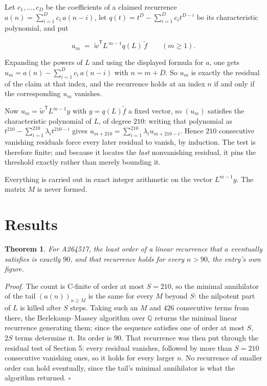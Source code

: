 \documentclass[11pt]{article}
\newtheorem{theorem}{Theorem}
\theoremstyle{definition}
\begin{document}
Let $c_1,\dots,c_D$ be the coefficients of a claimed recurrence $a(n) = \sum_{i=1}^{D} c_i\,a(n-i)$, let $q(t) = t^{D} - \sum_{i=1}^{D} c_i t^{D-i}$ be its characteristic polynomial, and put

\[u_m \;=\; \tilde w^{\mathsf T} L^{\,m-1} q(L)\,\tilde f \qquad (m \ge 1).\]

Expanding the powers of $L$ and using the displayed formula for $a$, one gets $u_m = a(n) - \sum_{i=1}^{D} c_i\,a(n-i)$ with $n = m + D$. So $u_m$ is exactly the residual of the claim at that index, and the recurrence holds at an index $n$ if and only if the corresponding $u_m$ vanishes.

Now $u_m = \tilde w^{\mathsf T} L^{m-1} y$ with $y = q(L)\tilde f$ a fixed vector, so $(u_m)$ satisfies the characteristic polynomial of $L$, of degree $210$: writing that polynomial as $t^{210} - \sum_{i=1}^{210} \lambda_i t^{210-i}$ gives $u_{m+210} = \sum_{i=1}^{210} \lambda_i u_{m+210-i}$. Hence $210$ consecutive vanishing residuals force every later residual to vanish, by induction. The test is therefore finite; and because it locates the {\itshape last} nonvanishing residual, it pins the threshold exactly rather than merely bounding it.

Everything is carried out in exact integer arithmetic on the vector $L^{m-1}y$. The matrix $M$ is never formed.

\section{Results}

\begin{theorem} For A264517, the least order of a linear recurrence that $a$ eventually satisfies is exactly $90$, and that recurrence holds for every $n > 90$, the entry's own figure.\end{theorem}

{\itshape Proof.} The count is C-finite of order at most $S = 210$, so the minimal annihilator of the tail $(a(n))_{n \ge M}$ is the same for every $M$ beyond $S$: the nilpotent part of $L$ is killed after $S$ steps. Taking such an $M$ and $426$ consecutive terms from there, the Berlekamp--Massey algorithm over $\mathbb{Q}$ returns the minimal linear recurrence generating them; since the sequence satisfies one of order at most $S$, $2S$ terms determine it. Its order is $90$. That recurrence was then put through the residual test of Section 5: every residual vanishes, followed by more than $S = 210$ consecutive vanishing ones, so it holds for every larger $n$. No recurrence of smaller order can hold eventually, since the tail's minimal annihilator is what the algorithm returned. $\square$
\end{document}
